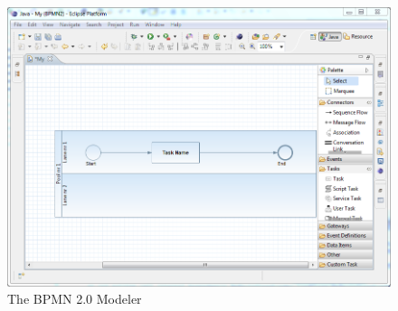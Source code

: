 \documentclass[a4paper]{scrreprt}
\begin{document}
\begin{figure}
	\centering	
	\includegraphics[scale=0.5]{images/modeler.png}
	\caption{The BPMN 2.0 Modeler}
	\label{fig:modeler.png}
\end{figure}
\end{document}

